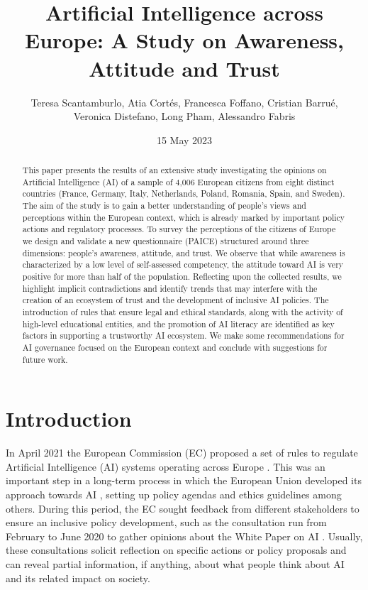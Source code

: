 \documentclass{article}
\title{Artificial Intelligence across Europe: A Study on Awareness, Attitude and Trust}
\author{Teresa Scantamburlo, Atia Cortés, Francesca Foffano, Cristian Barrué,\\ Veronica Distefano, Long Pham, Alessandro Fabris}
\date{15 May 2023}
\begin{document}

\maketitle

\begin{abstract}
This paper presents the results of an extensive study investigating the opinions on Artificial Intelligence (AI) of a sample of 4,006 European citizens from eight distinct countries (France, Germany, Italy, Netherlands, Poland, Romania, Spain, and Sweden). The aim of the study is to gain a better understanding of people’s views and perceptions within the European context, which is already marked by important policy actions and regulatory processes.
To survey the perceptions of the citizens of Europe we design and validate a new questionnaire (PAICE) structured around three dimensions: people's awareness, attitude, and trust. We observe that while awareness is characterized by a low level of self-assessed competency, the attitude toward AI is very positive for more than half of the population. Reflecting upon the collected results, we highlight implicit contradictions and identify trends that may interfere with the creation of an ecosystem of trust and the development of inclusive AI policies. The introduction of rules that ensure legal and ethical standards, along with the activity of high-level educational entities, and the promotion of AI literacy are identified as key factors in supporting a trustworthy AI ecosystem. We make some recommendations for AI governance focused on the European context and conclude with suggestions for future work.
\end{abstract}

\section{Introduction}
In April 2021 the European Commission (EC) proposed a set of rules to regulate Artificial Intelligence (AI) systems operating across Europe \cite{ai_act}. This was an important step in a long-term process in which the European Union developed its approach towards AI \cite{krarup2023european}, setting up policy agendas \cite{ai_agenda} and ethics guidelines \cite{Trustworthy_EU} among others. During this period, the EC sought feedback from different stakeholders to ensure an inclusive policy development, such as the consultation run from February to June 2020 to gather opinions about the White Paper on AI \cite{Whitepaper_EU}. Usually, these consultations solicit reflection on specific actions or policy proposals and can reveal partial information, if anything, about what people think about AI and its related impact on society. 
\end{document}
